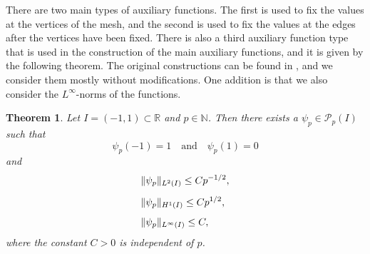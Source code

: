 \documentclass[english, 12pt, a4paper, sci, utf8, a-2b, online]{aaltothesis}
\theoremstyle{definition}
\theoremstyle{plain}
\newtheorem{theorem}{Theorem}[section]
\DeclarePairedDelimiter\norm{\lVert}{\rVert}
\numberwithin{equation}{section}
\begin{document}
There are two main types of auxiliary functions.
The first is used to fix the values at the vertices of the mesh,
and the second is used to fix the values at the edges
after the vertices have been fixed.
There is also a third auxiliary function type that is used
in the construction of the main auxiliary functions,
and it is given by the following theorem.
The original constructions can be found in \cite{babuskasuri1987},
and we consider them mostly without modifications. One addition is that
we also consider the $L^{\infty}$-norms of the functions.
\begin{theorem}
    \label{thm:auxiliary_auxiliary_function}
    Let $I=(-1,1) \subset \mathbb{R}$ and $p \in \mathbb{N}$.
    Then there exists a $\psi_p \in \mathcal{P}_p(I)$ such that
    \begin{equation}
        \label{eq:auxiliary_auxiliary_function_endpoints}
        \psi_p(-1)=1 \quad \text{and} \quad \psi_p(1)=0
    \end{equation}
    and
    \begin{align}
        \label{eq:auxiliary_auxiliary_function_res1}
        &\norm{\psi_p}_{L^2(I)} \leq C p^{-1/2}, \\[0.5em]
        \label{eq:auxiliary_auxiliary_function_res2}
        &\norm{\psi_p}_{H^1(I)} \leq C p^{1/2}, \\[0.5em]
        \label{eq:auxiliary_auxiliary_function_res3}
        &\norm{\psi_p}_{L^{\infty}(I)} \leq C,
    \end{align}
    where the constant $C > 0$ is independent of $p$.
\end{theorem}
\end{document}
